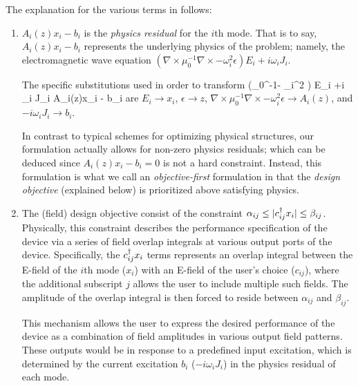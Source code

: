 \documentclass[letterpaper,10pt]{article}
\begin{document}
The explanation for the various terms in  follows:
\begin{enumerate}
\item 
    $A_i(z)x_i - b_i$ is the \emph{physics residual} for the $i$th mode.
    That is to say, $A_i(z)x_i - b_i$ represents the underlying physics
        of the problem; namely, the electromagnetic wave equation
        \mbox{$(\nabla\times\mu_0^{-1}\nabla\times - \omega_i^2 \epsilon) E_i 
            +i \omega_i J_i $}.

    The specific substitutions used in order to transform
        \BE (\nabla\times\mu_0^{-1}\nabla\times - \omega_i^2 \epsilon) E_i 
            +i \omega_i J_i  \quad\longrightarrow\quad A_i(z)x_i - b_i \EE
        are
    \BI $E_i \to x_i$,
    \I  $\epsilon \to z$,
    \I  $\nabla\times\mu_0^{-1}\nabla\times - \omega_i^2 \epsilon \to A_i(z)$, and
    \I  $ -i\omega_i J_i \to b_i$.  \EI

    In contrast to typical schemes for optimizing physical structures,
        our formulation actually allows for non-zero physics residuals;
        which can be deduced since $A_i(z)x_i-b_i=0$ is not a hard constraint.
    Instead, this formulation is what we call an \emph{objective-first} %
        formulation in that the \emph{design objective} (explained below)
        is prioritized above satisfying physics.

\item
    The (field) design objective consist of 
        the constraint $\alpha_{ij} \le |c_{ij}^\dagger x_i| \le \beta_{ij}$.
    Physically, this constraint describes 
        the performance specification of the device 
        via a series of field overlap integrals 
        at various output ports of the device.
    Specifically, the $c_{ij}^\dagger x_i$ terms represents an overlap integral between
        the E-field of the $i$th mode ($x_i$)
        with an E-field of the user's choice ($c_{ij}$),
        where the additional subscript $j$ allows the user
        to include multiple such fields.
    The amplitude of the overlap integral is then forced to reside between
        $\alpha_{ij}$ and $\beta_{ij}$.

    This mechanism allows the user to express 
        the desired performance of the device
        as a combination of field amplitudes in various output field patterns.
    These outputs would be in response to a predefined input excitation,
        which is determined by the current excitation $b_i$ ($-i\omega_i J_i$)
        in the physics residual of each mode.


\end{enumerate}
\end{document}
